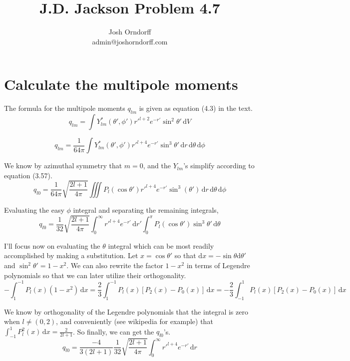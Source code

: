 \documentclass[10pt,a4paper]{article}
\begin{document}
\title{J.D. Jackson Problem 4.7}
\author{Josh Orndorff \\ admin@joshorndorff.com}
\maketitle

\section{Calculate the multipole moments}
The formula for the multipole moments $q_{lm}$ is given as equation (4.3) in the text.
\begin{equation}
q_{lm}=\int Y_{lm}^*(\theta', \phi'){r'}^{l+2}e^{-r'}\sin^2{\theta'} \, \mathrm{d}V
\end{equation}

\begin{equation}
q_{lm}=\frac{1}{64\pi}\int Y_{lm}^*(\theta', \phi'){r'}^{l+4}e^{-r'}\sin^3{\theta'} \, \mathrm{d}r \,\mathrm{d}\theta \,\mathrm{d}\phi
\end{equation}

We know by azimuthal symmetry that $m=0$, and the $Y_{lm}$'s simplify according to equation (3.57).
\begin{equation}
q_{l0}=\frac{1}{64\pi} \sqrt{\frac{2l+1}{4\pi}}\iiint P_l(\cos\theta'){r'}^{l+4} e^{-r'} \sin^3(\theta') \, \mathrm{d}r \,\mathrm{d}\theta \,\mathrm{d}\phi
\end{equation}

Evaluating the easy $\phi$ integral and separating the remaining integrals,
\begin{equation}
q_{l0}=\frac{1}{32}\sqrt{\frac{2l+1}{4\pi}}\int_0^\infty {r'}^{l+4}e^{-r'}\,\mathrm{d}r' \int_0^{\pi}P_l(\cos\theta')\sin^3\theta' \, \mathrm{d}\theta
\end{equation}

I'll focus now on evaluating the $\theta$ integral which can be most readily accomplished by making a substitution.  Let $x=\cos\theta'$ so that $\mathrm{d}x=-\sin\theta\mathrm{d}\theta'$ and $\sin^2\theta'=1-x^2$.  We can also rewrite the factor $1-x^2$ in terms of Legendre polynomials so that we can later utilize their orthogonality.
\begin{equation}
-\int_1^{-1}P_l(x)(1-x^2)\,\mathrm{d}x = \frac{2}{3}\int_1^{-1}P_l(x)[P_2(x)-P_0(x)] \,\mathrm{d}x
= -\frac{2}{3}\int_{-1}^1 P_l(x)[P_2(x)-P_0(x)] \,\mathrm{d}x
\end{equation}

We know by orthogonality of the Legendre polynomials that the integral is zero when $l\neq (0,2) $, and conveniently (see wikipedia for example) that $\int_{-1}^1P_l^2(x) \,\mathrm{d}x = \frac{2}{2l+1}$.  So finally, we can get the $q_{l0}$'s.
\begin{equation}
q_{l0}=\frac{-4}{3(2l+1)}\frac{1}{32}\sqrt{\frac{2l+1}{4\pi}}\int_0^\infty {r'}^{l+4}e^{-r'}\,\mathrm{d}r
\end{equation}
\end{document}
